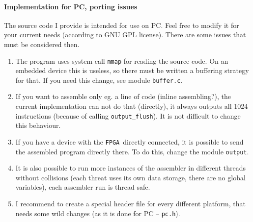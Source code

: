 \documentclass[10pt,a4paper]{article}
\def\FPGA{\texttt{FPGA}}
\begin{document}
\paragraph{Implementation for PC, porting issues}
The source code I provide is intended for use on PC. Feel free to modify it for your current needs (according to GNU GPL 
	license). There are some issues that must be considered then.
\begin{enumerate}
	\item The program uses system call \texttt{mmap} for reading the source code. On an embedded device this is
		useless, so there must be written a buffering strategy for that. If you need this change, see module \texttt{buffer.c}.
	\item If you want to assemble only eg. a line of code (inline assembling?), the current implementation can not do that 
		(directly), it always outputs all 1024 instructions (because of calling \texttt{output\_flush}). It is not difficult 
		to change this behaviour.
	\item If you have a device with the \FPGA\ directly connected, it is possible to send the assembled program directly there.
		To do this, change the module \texttt{output}.
	\item It is also possible to run more instances of the assembler in different threads without collisions (each threat uses its
		own data storage, there are no global variables), each assembler run is thread safe.
	\item I recommend to create a special header file for every different platform, that needs some wild changes (as it is done
		for PC -- \texttt{pc.h}).		
\end{enumerate}
\end{document}
